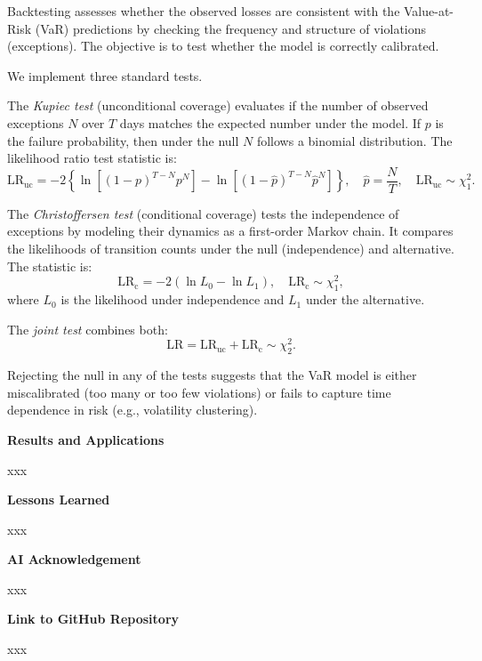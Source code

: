 \documentclass[12pt]{article}
\begin{document}
\vspace{0.6em}

\underline{}

\vspace{0.6em}

Backtesting assesses whether the observed losses are consistent with the Value-at-Risk (VaR) predictions by checking the frequency and structure of violations (exceptions). The objective is to test whether the model is correctly calibrated.

We implement three standard tests.

The \textit{Kupiec test} (unconditional coverage) evaluates if the number of observed exceptions $N$ over $T$ days matches the expected number under the model. If $p$ is the failure probability, then under the null $N$ follows a binomial distribution. The likelihood ratio test statistic is:
\[
\text{LR}_{\text{uc}} = -2 \left\{ \ln\left[(1 - p)^{T - N} p^N \right] - \ln\left[(1 - \hat{p})^{T - N} \hat{p}^N \right] \right\}, \quad \hat{p} = \frac{N}{T}, \quad \text{LR}_{\text{uc}} \sim \chi^2_1.
\]

The \textit{Christoffersen test} (conditional coverage) tests the independence of exceptions by modeling their dynamics as a first-order Markov chain. It compares the likelihoods of transition counts under the null (independence) and alternative. The statistic is:
\[
\text{LR}_{\text{c}} = -2 (\ln L_0 - \ln L_1), \quad \text{LR}_{\text{c}} \sim \chi^2_1,
\]
where $L_0$ is the likelihood under independence and $L_1$ under the alternative.

The \textit{joint test} combines both:
\[
\text{LR} = \text{LR}_{\text{uc}} + \text{LR}_{\text{c}} \sim \chi^2_2.
\]

Rejecting the null in any of the tests suggests that the VaR model is either miscalibrated (too many or too few violations) or fails to capture time dependence in risk (e.g., volatility clustering).



\textbf{Results and Applications}

xxx

\textbf{Lessons Learned}

xxx

\textbf{AI Acknowledgement}

xxx

\textbf{Link to GitHub Repository}

xxx
\end{document}
